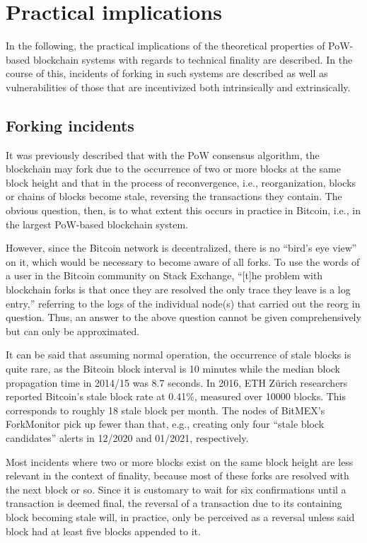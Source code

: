 \section{Practical implications}

In the following, the practical implications of the theoretical properties of PoW-based blockchain systems with regards to technical finality are described.
In the course of this, incidents of forking in such systems are described as well as vulnerabilities of those that are incentivized both intrinsically and extrinsically.

\subsection{Forking incidents}

It was previously described that with the PoW consensus algorithm, the blockchain may fork due to the occurrence of two or more blocks at the same block height and that in the process of reconvergence, i.e., reorganization, blocks or chains of blocks become stale, reversing the transactions they contain.
The obvious question, then, is to what extent this occurs in practice in Bitcoin, i.e., in the largest PoW-based blockchain system.

However, since the Bitcoin network is decentralized, there is no ``bird's eye view'' on it, which would be necessary to become aware of all forks.
To use the words of a user in the Bitcoin community on Stack Exchange, ``[t]he problem with blockchain forks is that once they are resolved the only trace they leave is a log entry,'' \autocite{sebitcoin2012longestfork} referring to the logs of the individual node(s) that carried out the reorg in question.
Thus, an answer to the above question cannot be given comprehensively but can only be approximated.

It can be said that assuming normal operation, the occurrence of stale blocks is quite rare, as the Bitcoin block interval is 10 minutes while the median block propagation time in 2014/15 was 8.7 seconds. \autocite[7]{croman2016}
In 2016, ETH Zürich researchers reported Bitcoin's stale block rate at 0.41\%, measured over 10000 blocks. \autocite[3]{gervais2016}
This corresponds to roughly 18 stale block per month.
The nodes of BitMEX's ForkMonitor pick up fewer than that, e.g., creating only four ``stale block candidates'' alerts in 12/2020 and 01/2021, respectively. \autocite{bitmex2021}

Most incidents where two or more blocks exist on the same block height are less relevant in the context of finality, because most of these forks are resolved with the next block or so.
Since it is customary to wait for six confirmations until a transaction is deemed final, the reversal of a transaction due to its containing block becoming stale will, in practice, only be perceived as a reversal unless said block had at least five blocks appended to it.

